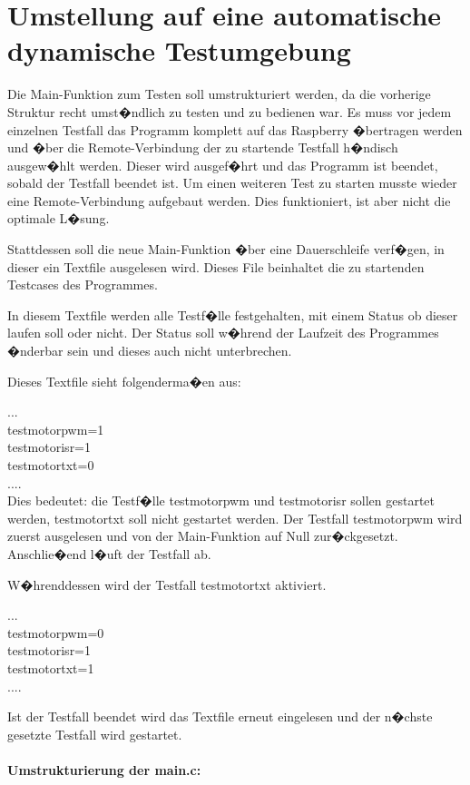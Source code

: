 \newpage
\section{Umstellung auf eine automatische dynamische Testumgebung}

Die Main-Funktion zum Testen soll umstrukturiert werden, da die vorherige Struktur recht umst�ndlich zu testen und zu bedienen war. Es muss vor jedem einzelnen Testfall das Programm komplett auf das Raspberry �bertragen werden und �ber die Remote-Verbindung der zu startende Testfall h�ndisch ausgew�hlt werden. Dieser wird ausgef�hrt und das Programm ist beendet, sobald der Testfall beendet ist. Um einen weiteren Test zu starten musste wieder eine Remote-Verbindung aufgebaut werden. Dies funktioniert, ist aber nicht die optimale L�sung.

Stattdessen soll die neue Main-Funktion �ber eine Dauerschleife verf�gen, in dieser ein Textfile ausgelesen wird. Dieses File beinhaltet die zu startenden Testcases des Programmes.

In diesem Textfile werden alle Testf�lle festgehalten, mit einem Status ob dieser laufen soll oder nicht. Der Status soll w�hrend der Laufzeit des Programmes �nderbar sein und dieses auch nicht unterbrechen.

Dieses Textfile sieht folgenderma�en aus:

...\\
testmotorpwm=1\\
testmotorisr=1\\
testmotortxt=0\\
....\\

Dies bedeutet: die Testf�lle testmotorpwm und testmotorisr sollen gestartet werden, testmotortxt soll nicht gestartet werden.
Der Testfall testmotorpwm wird zuerst ausgelesen und von der Main-Funktion auf Null zur�ckgesetzt. Anschlie�end l�uft der Testfall ab.

W�hrenddessen wird der Testfall testmotortxt aktiviert. 

...\\
testmotorpwm=0\\
testmotorisr=1\\
testmotortxt=1\\
....

Ist der Testfall beendet wird das Textfile erneut eingelesen und der n�chste gesetzte Testfall wird gestartet.

\newpage
\paragraph{Umstrukturierung der main.c:}

